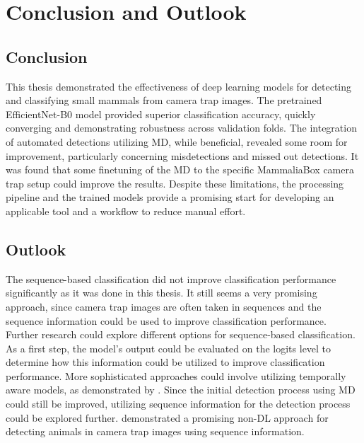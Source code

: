 


\section{Conclusion and Outlook}
\label{conclusion_outlook}

\subsection{Conclusion}

This thesis demonstrated the effectiveness of deep learning models for detecting and classifying small mammals from camera trap images.
The pretrained EfficientNet-B0 model provided superior classification accuracy, quickly converging and demonstrating robustness across validation folds.
The integration of automated detections utilizing \ac{MD}, while beneficial, revealed some room for improvement, particularly concerning misdetections and missed out detections.
It was found that some finetuning of the \ac{MD} to the specific MammaliaBox camera trap setup could improve the results.
Despite these limitations, the processing pipeline and the trained models provide a promising start for developing an applicable tool and a workflow to reduce manual effort.

\subsection{Outlook}
The sequence-based classification did not improve classification performance significantly as it was done in this thesis.
It still seems a very promising approach, since camera trap images are often taken in sequences and the sequence information could be used to improve classification performance.
Further research could explore different options for sequence-based classification.
As a first step, the model's output could be evaluated on the logits level to determine how this information could be utilized to improve classification performance.
More sophisticated approaches could involve utilizing temporally aware models, as demonstrated by \textcite{muhammadTemporalSwinFPNNetNovel2024}.
Since the initial detection process using \ac{MD} could still be improved, utilizing sequence information for the detection process could be explored further.
\textcite{zotinANIMALDETECTIONUSING2019} demonstrated a promising non-\ac{DL} approach for detecting animals in camera trap images using sequence information.

